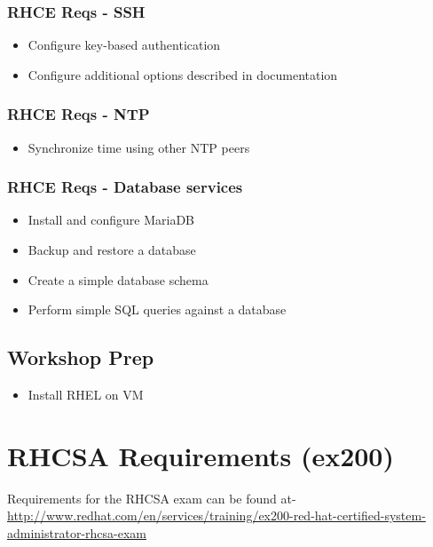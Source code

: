 \documentclass[letterpaper,10pt,english]{sphinxmanual}
\begin{document}
\subsection{RHCE Reqs - SSH}
\label{intro:rhce-reqs-ssh}\begin{itemize}
\item {} 
Configure key-based authentication

\item {} 
Configure additional options described in documentation

\end{itemize}


\subsection{RHCE Reqs - NTP}
\label{intro:rhce-reqs-ntp}\begin{itemize}
\item {} 
Synchronize time using other NTP peers

\end{itemize}


\subsection{RHCE Reqs - Database services}
\label{intro:rhce-reqs-database-services}\begin{itemize}
\item {} 
Install and configure MariaDB

\item {} 
Backup and restore a database

\item {} 
Create a simple database schema

\item {} 
Perform simple SQL queries against a database

\end{itemize}


\section{Workshop Prep}
\label{intro:workshop-prep}\begin{itemize}
\item {} 
Install RHEL on VM

\end{itemize}


\chapter{RHCSA Requirements (ex200)}
\label{rhcsa:rhcsa-requirements-ex200}\label{rhcsa::doc}
Requirements for the RHCSA exam can be found at-
\href{http://www.redhat.com/en/services/training/ex200-red-hat-certified-system-administrator-rhcsa-exam}{http://www.redhat.com/en/services/training/ex200-red-hat-certified-system-administrator-rhcsa-exam}
\end{document}

